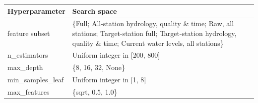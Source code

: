 \begin{tabularx}{\textwidth}{@{}lX@{}}
\toprule
\textbf{Hyperparameter} & \textbf{Search space} \\
\midrule
feature subset & \{Full; All-station hydrology, quality \& time; Raw, all stations; Target-station full; Target-station hydrology, quality \& time; Current water levels, all stations\} \\
\addlinespace
n\_estimators & Uniform integer in [200, 800] \\
\addlinespace
max\_depth & \{8, 16, 32, None\} \\
\addlinespace
min\_samples\_leaf & Uniform integer in [1, 8] \\
\addlinespace
max\_features & \{sqrt, 0.5, 1.0\} \\
\bottomrule
\end{tabularx}
